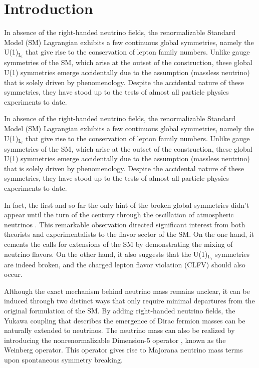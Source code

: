 \chapter{Introduction}
\label{chap:Introduction}

In absence of the right-handed neutrino fields, the renormalizable Standard Model (SM) Lagrangian exhibits a few continuous global symmetries, namely the U(1)$_{\text{L}_{i}}$ that give rise to the conservation of lepton family numbers. Unlike gauge symmetries of the SM, which arise at the outset of the construction, these global U(1) symmetries emerge accidentally due to the assumption (massless neutrino) that is solely driven by phenomenology. Despite the accidental nature of these symmetries, they have stood up to the tests of almost all particle physics experiments to date.  

In absence of the right-handed neutrino fields, the renormalizable Standard Model (SM) Lagrangian exhibits a few continuous global symmetries, namely the U(1)$_{\text{L}_{i}}$ that give rise to the conservation of lepton family numbers. Unlike gauge symmetries of the SM, which arise at the outset of the construction, these global U(1) symmetries emerge accidentally due to the assumption (massless neutrino) that is solely driven by phenomenology. Despite the accidental nature of these symmetries, they have stood up to the tests of almost all particle physics experiments to date.  

In fact, the first and so far the only hint of the broken global symmetries didn't appear until the turn of the century through the oscillation of atmospheric neutrinos \cite{Super-Kamiokande:1998kpq,SNO:2002tuh}. This remarkable observation directed significant interest from both theorists and experimentalists to the flavor sector of the SM. On the one hand, it cements the calls for extensions of the SM by demonstrating the mixing of neutrino flavors. On the other hand, it also suggests that the U(1)$_{\text{L}_{i}}$ symmetries are indeed broken, and the charged lepton flavor violation (CLFV) should also occur. 

Although the exact mechanism behind neutrino mass remains unclear, it can be induced through two distinct ways that only require minimal departures from the original formulation of the SM. By adding right-handed neutrino fields, the Yukawa coupling \cite{Weinberg:1967tq} that describes the emergence of Dirac fermion masses can be naturally extended to neutrinos. The neutrino mass can also be realized by introducing the nonrenormalizable Dimension-5 operator \cite{Weinberg:1979sa}, known as the Weinberg operator. This operator gives rise to Majorana neutrino mass terms upon spontaneous symmetry breaking. 

